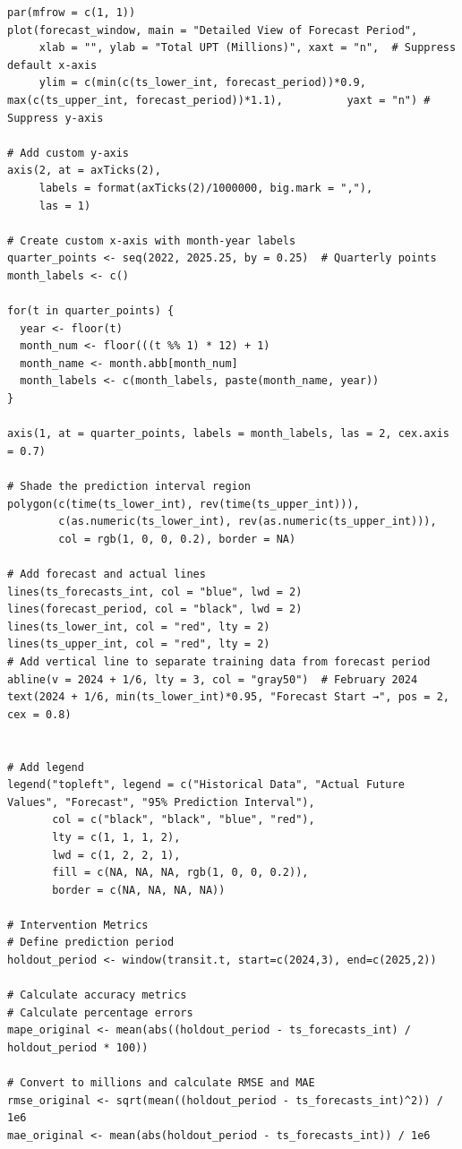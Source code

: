 \documentclass[11pt]{article}
\begin{document}
{\begin{verbatim}
par(mfrow = c(1, 1))
plot(forecast_window, main = "Detailed View of Forecast Period",
     xlab = "", ylab = "Total UPT (Millions)", xaxt = "n",  # Suppress default x-axis
     ylim = c(min(c(ts_lower_int, forecast_period))*0.9, max(c(ts_upper_int, forecast_period))*1.1),          yaxt = "n") # Suppress y-axis

# Add custom y-axis
axis(2, at = axTicks(2),
     labels = format(axTicks(2)/1000000, big.mark = ","),
     las = 1)

# Create custom x-axis with month-year labels
quarter_points <- seq(2022, 2025.25, by = 0.25)  # Quarterly points
month_labels <- c()

for(t in quarter_points) {
  year <- floor(t)
  month_num <- floor(((t %% 1) * 12) + 1)
  month_name <- month.abb[month_num]
  month_labels <- c(month_labels, paste(month_name, year))
}

axis(1, at = quarter_points, labels = month_labels, las = 2, cex.axis = 0.7)

# Shade the prediction interval region
polygon(c(time(ts_lower_int), rev(time(ts_upper_int))),
        c(as.numeric(ts_lower_int), rev(as.numeric(ts_upper_int))),
        col = rgb(1, 0, 0, 0.2), border = NA)

# Add forecast and actual lines
lines(ts_forecasts_int, col = "blue", lwd = 2)
lines(forecast_period, col = "black", lwd = 2)
lines(ts_lower_int, col = "red", lty = 2)
lines(ts_upper_int, col = "red", lty = 2)
# Add vertical line to separate training data from forecast period
abline(v = 2024 + 1/6, lty = 3, col = "gray50")  # February 2024
text(2024 + 1/6, min(ts_lower_int)*0.95, "Forecast Start →", pos = 2, cex = 0.8)


# Add legend
legend("topleft", legend = c("Historical Data", "Actual Future Values", "Forecast", "95% Prediction Interval"),
       col = c("black", "black", "blue", "red"),
       lty = c(1, 1, 1, 2),
       lwd = c(1, 2, 2, 1),
       fill = c(NA, NA, NA, rgb(1, 0, 0, 0.2)),
       border = c(NA, NA, NA, NA))

# Intervention Metrics
# Define prediction period
holdout_period <- window(transit.t, start=c(2024,3), end=c(2025,2))

# Calculate accuracy metrics
# Calculate percentage errors
mape_original <- mean(abs((holdout_period - ts_forecasts_int) / holdout_period * 100))

# Convert to millions and calculate RMSE and MAE
rmse_original <- sqrt(mean((holdout_period - ts_forecasts_int)^2)) / 1e6
mae_original <- mean(abs(holdout_period - ts_forecasts_int)) / 1e6


\end{verbatim}}
\end{document}
